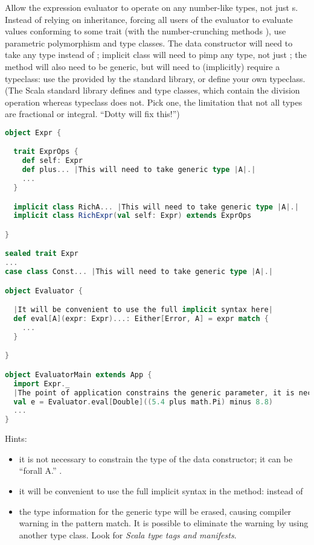 \documentclass[10 pt]{article}
\begin{document}
\begin{example}
Allow the expression evaluator to operate on any number-like types, not just s. Instead of relying on inheritance, forcing all users of the evaluator to evaluate values conforming to some trait (with the number-crunching methods \pcode{+, -, *, /}), use parametric polymorphism and type classes. The  data constructor will need to take any type instead of ;  implicit class will need to pimp any type, not just ; the  method will also need to be generic, but will need to (implicitly) require a typeclass: use the  provided by the standard library, or define your own  typeclass. (The Scala standard library defines  and  type classes, which contain the division operation whereas  typeclass does not. Pick one, the limitation that not all types are fractional or integral. ``Dotty will fix this!'')

\begin{lstlisting}[caption={Flexible evaluator with DSL and typeclasses}, label={code:eepm3}, language=Scala, escapechar=|]
object Expr {

  trait ExprOps {
    def self: Expr
    def plus... |This will need to take generic type |A|.|
    ...
  }

  implicit class RichA... |This will need to take generic type |A|.|
  implicit class RichExpr(val self: Expr) extends ExprOps

}

sealed trait Expr
...
case class Const... |This will need to take generic type |A|.|

object Evaluator {

  |It will be convenient to use the full implicit syntax here|
  def eval[A](expr: Expr)...: Either[Error, A] = expr match {
    ...
  }

}

object EvaluatorMain extends App {
  import Expr._
  |The point of application constrains the generic parameter, it is necessary to specify the type |A|. in |eval|.|
  val e = Evaluator.eval[Double]((5.4 plus math.Pi) minus 8.8)
  ...
}
\end{lstlisting}

Hints: \begin{itemize}
  \item it is not necessary to constrain the type of the  data constructor; it can be ``forall A.'' .
  \item it will be convenient to use the full implicit syntax in the  method:  instead of 
  \item the type information for the generic type  will be erased, causing compiler warning in the pattern match. It is possible to eliminate the warning by using another type class. Look for \emph{Scala type tags and manifests}.
\end{itemize}

\end{example}
\end{document}
